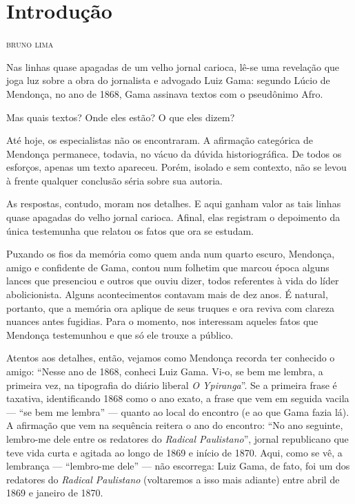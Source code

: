 \chapter*{Introdução}

\begin{flushright}
\textsc{bruno lima}
\end{flushright}

Nas linhas quase apagadas de um velho jornal carioca, lê-se uma
revelação que joga luz sobre a obra do jornalista e advogado Luiz Gama:
segundo Lúcio de Mendonça, no ano de 1868, Gama assinava textos com o
pseudônimo Afro.

Mas quais textos? Onde eles estão? O que eles dizem?

Até hoje, os especialistas não os encontraram. A afirmação categórica de
Mendonça permanece, todavia, no vácuo da dúvida historiográfica. De
todos os esforços, apenas um texto apareceu. Porém, isolado e sem
contexto, não se levou à frente qualquer conclusão séria sobre sua
autoria.

As respostas, contudo, moram nos detalhes. E aqui ganham valor as tais
linhas quase apagadas do velho jornal carioca. Afinal, elas registram o
depoimento da única testemunha que relatou os fatos que ora se estudam.

Puxando os fios da memória como quem anda num quarto escuro, Mendonça,
amigo e confidente de Gama, contou num folhetim que marcou época alguns
lances que presenciou e outros que ouviu dizer, todos referentes à vida
do líder abolicionista. Alguns acontecimentos contavam mais de dez anos.
É natural, portanto, que a memória ora aplique de seus truques e ora
reviva com clareza nuances antes fugidias. Para o momento, nos
interessam aqueles fatos que Mendonça testemunhou e que só ele trouxe a
público.

Atentos aos detalhes, então, vejamos como Mendonça recorda ter conhecido
o amigo: ``Nesse ano de 1868, conheci Luiz Gama. Vi-o, se bem me lembra,
a primeira vez, na tipografia do diário liberal \emph{O Ypiranga}''. Se a
primeira frase é taxativa, identificando 1868 como o ano exato, a frase
que vem em seguida vacila --- ``se bem me lembra'' --- quanto ao local do
encontro (e ao que Gama fazia lá). A afirmação que vem na sequência
reitera o ano do encontro: ``No ano seguinte, lembro-me dele entre os
redatores do \emph{Radical Paulistano}'', jornal republicano que teve
vida curta e agitada ao longo de 1869 e início de 1870. Aqui, como se
vê, a lembrança --- ``lembro-me dele'' --- não escorrega: Luiz Gama, de
fato, foi um dos redatores do \emph{Radical Paulistano}
(voltaremos a isso mais adiante) entre abril de 1869 e janeiro de 1870.

